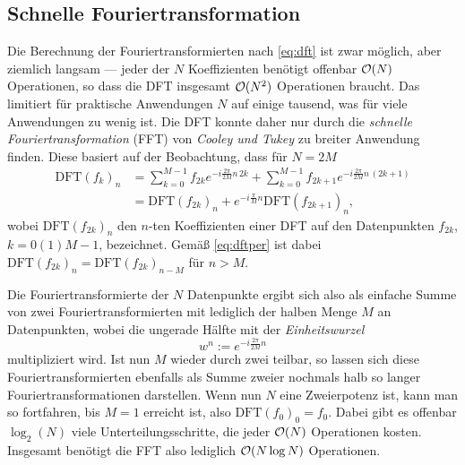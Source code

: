 \subsection{Schnelle Fouriertransformation}

Die Berechnung der Fouriertransformierten nach \eqref{eq:dft} ist zwar
möglich, aber ziemlich langsam --- jeder der $N$ Koeffizienten
benötigt offenbar $\mathcal O(N)$ Operationen, so dass die DFT insgesamt
$\mathcal O(N^2)$ Operationen braucht. Das limitiert für praktische
Anwendungen $N$ auf einige tausend, was für viele Anwendungen zu wenig
ist. Die DFT konnte daher nur durch die \emph{schnelle
  Fouriertransformation} (FFT) von \emph{Cooley und Tukey} zu breiter
Anwendung finden. Diese basiert auf der Beobachtung, dass für $N=2M$
\begin{align}
  \text{DFT}(f_k)_n &= \sum_{k=0}^{M-1} f_{2k} e^{-i\frac{2\pi}{2M} n\, 2k} +
  \sum_{k=0}^{M-1} f_{2k+1} e^{-i\frac{2\pi}{2M} n\, (2k + 1)}\\
  &= \text{DFT}(f_{2k})_n + e^{-i\frac{\pi}{M} n}
  \text{DFT}(f_{2k+1})_n,
\end{align}
wobei $\text{DFT}(f_{2k})_n$ den $n$-ten Koeffizienten einer DFT auf
den Datenpunkten $f_{2k}$, $k=0(1)M-1$, bezeichnet. Gemäß
\eqref{eq:dftper} ist dabei $\text{DFT}(f_{2k})_n =
\text{DFT}(f_{2k})_{n-M}$ für $n>M$.

Die Fouriertransformierte der $N$ Datenpunkte ergibt sich also als
einfache Summe von zwei
Fouriertransformierten mit lediglich der halben Menge $M$ an
Datenpunkten, wobei die ungerade Hälfte mit der \emph{Einheitswurzel}
\begin{equation}
  w^n := e^{-i\frac{2\pi}{2M} n}
\end{equation}
multipliziert wird.  Ist nun $M$ wieder durch zwei teilbar, so lassen
sich diese Fouriertransformierten ebenfalls als Summe zweier nochmals
halb so langer Fouriertransformationen darstellen. Wenn nun $N$ eine
Zweierpotenz ist, kann man so fortfahren, bis $M=1$ erreicht ist, also
$\text{DFT}(f_0)_0 = f_0$. Dabei gibt es offenbar $\log_2(N)$ viele
Unterteilungsschritte, die jeder $\mathcal O(N)$ Operationen kosten. Insgesamt
benötigt die FFT also lediglich $\mathcal O(N\log N)$ Operationen.

